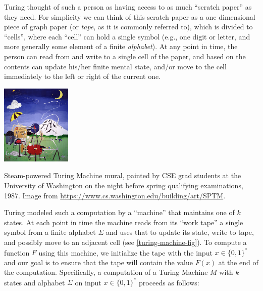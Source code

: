 Turing thought of such a person as having access to as much ``scratch
paper'' as they need. For simplicity we can think of this scratch paper
as a one dimensional piece of graph paper (or \emph{tape}, as it is
commonly referred to), which is divided to ``cells'', where each
``cell'' can hold a single symbol (e.g., one digit or letter, and more
generally some element of a finite \emph{alphabet}). At any point in
time, the person can read from and write to a single cell of the paper,
and based on the contents can update his/her finite mental state, and/or
move to the cell immediately to the left or right of the current one.


\begin{marginfigure}
\centering
\includegraphics[width=\linewidth, height=1.5in, keepaspectratio]{../figure/SPTM.jpg}
\caption{Steam-powered Turing Machine mural, painted by CSE grad
students at the University of Washington on the night before spring
qualifying examinations, 1987. Image from
\url{https://www.cs.washington.edu/building/art/SPTM}.}
\label{steamturingmachine}
\end{marginfigure}

Turing modeled such a computation by a ``machine'' that maintains one of
\(k\) states. At each point in time the machine reads from its ``work
tape'' a single symbol from a finite alphabet \(\Sigma\) and uses that
to update its state, write to tape, and possibly move to an adjacent
cell (see \cref{turing-machine-fig}). To compute a function \(F\) using
this machine, we initialize the tape with the input \(x\in \{0,1\}^*\)
and our goal is to ensure that the tape will contain the value \(F(x)\)
at the end of the computation. Specifically, a computation of a Turing
Machine \(M\) with \(k\) states and alphabet \(\Sigma\) on input
\(x\in \{0,1\}^*\) proceeds as follows:

